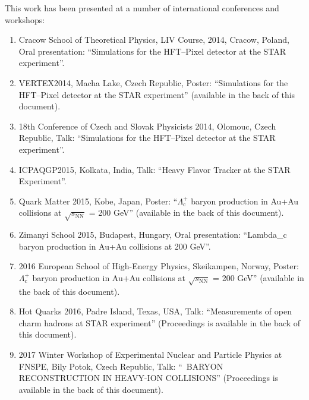 This work has been presented at a number of international conferences and workshops:
\begin{enumerate}
\item Cracow School of Theoretical Physics, LIV Course, 2014, Cracow, Poland, Oral presentation: ``Simulations for the HFT--Pixel detector at the STAR experiment''.
\item VERTEX2014, Macha Lake, Czech Republic, Poster: ``Simulations for the HFT--Pixel detector at the STAR experiment'' (available in the back of this document).
\item 18th Conference of Czech and Slovak Physicists 2014, Olomouc, Czech Republic, Talk: ``Simulations for the HFT--Pixel detector at the STAR experiment''.
\item ICPAQGP2015, Kolkata, India, Talk: ``Heavy Flavor Tracker at the STAR Experiment''.
\item Quark Matter 2015, Kobe, Japan, Poster: ``$\Lambda_\mathrm{c}^+$ baryon production in Au+Au collisions at
$\sqrt{s_{\mathrm{NN}}}$ = 200 GeV'' (available in the back of this document).
\item Zimanyi School 2015, Budapest, Hungary, Oral presentation: ``Lambda\_c baryon production in Au+Au collisions at 200 GeV''.
\item 2016 European School of High-Energy Physics, Skeikampen, Norway, Poster: $\Lambda_\mathrm{c}^+$ baryon production in Au+Au collisions at
$\sqrt{s_{\mathrm{NN}}}$ = 200 GeV'' (available in the back of this document).
\item Hot Quarks 2016, Padre Island, Texas, USA, Talk: ``Measurements of open charm hadrons at STAR experiment'' (Proceedings is available in the back of this document).
\item 2017 Winter Workshop of Experimental Nuclear and Particle Physics at FNSPE, Bily Potok, Czech Republic, Talk: ``\Lambdac\ BARYON RECONSTRUCTION IN HEAVY-ION COLLISIONS'' (Proceedings is available in the back of this document).

\end{enumerate}

